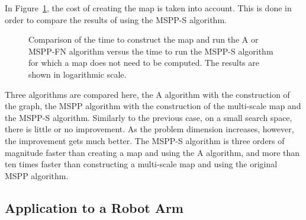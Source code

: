 \documentclass[letterpaper, 10 pt, conference]{ieeeconf}
\theoremstyle{definition}
\begin{document}
In Figure~\ref{comparison2}, the cost of creating the map is taken into account. This is done in order
to compare the results of using the MSPP-S algorithm.
\begin{figure}[ht]
\centering
{} \caption{Comparison of the time to construct the map and run the A or MSPP-FN algorithm versus the time to run the MSPP-S algorithm for which a map does not need to be computed. The results are shown in logarithmic scale.}
\label{comparison2}
\end{figure}
Three algorithms are compared here, the A algorithm with the construction of the graph, the MSPP algorithm with the construction of the multi-scale map and the MSPP-S algorithm.
Similarly to the previous case, on a small search space, there is little or no improvement.
As the problem dimension increases, however, the improvement gets much better.
The MSPP-S algorithm is three orders of magnitude faster than creating a map and using the A algorithm, and more than ten times faster than constructing a multi-scale map and using the original MSPP algorithm.

\subsection{Application to a Robot Arm}
\end{document}

